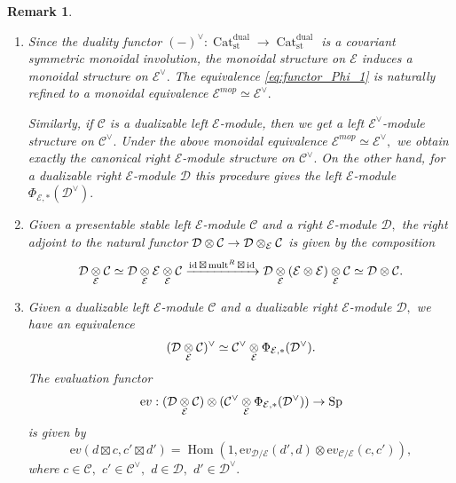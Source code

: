 \documentclass[11pt,leqno]{amsart}
\newtheorem{remark}[theo]{Remark}
\numberwithin{equation}{section}
\def\Hom{\operatorname{Hom}}
\newcommand{\tens}[1]{%
  \mathbin{\mathop{\otimes}\displaylimits_{#1}}%
}
\newcommand{\xto}{\xrightarrow}
\newcommand{\Cat}{\operatorname{Cat}}
\newcommand{\st}{\operatorname{st}}
\newcommand{\dual}{\operatorname{dual}}
\newcommand{\ev}{\mathrm ev}
\newcommand{\cD}{{\mathcal D}}
\newcommand{\cC}{{\mathcal C}}
\newcommand{\cE}{{\mathcal E}}
\newcommand{\Fun}{\operatorname{Fun}}
\newcommand{\Sp}{\operatorname{Sp}}
\newcommand{\id}{\operatorname{id}}
\newcommand{\mult}{\operatorname{mult}}
\begin{document}
\begin{remark}
\begin{enumerate}[label=(\roman*),ref=(\roman*)]
\begin{equation*}
\end{equation*}
Similarly, if $\cD$ is a dualizable right $\cE$-module, then the left $\cE$-module structure on $\cD^{\vee}$ is given by
\begin{equation*}
\cE\xto{\Phi^{-1}_{\cE}}\cE\to\Fun^L(\cD,\cD)^{mop}\simeq \Fun^L(\cD^{\vee},\cD^{\vee}).
\end{equation*}
\item Since the duality functor $(-)^{\vee}:\Cat_{\st}^{\dual}\to\Cat_{\st}^{\dual}$ is a covariant symmetric monoidal involution, the monoidal structure on $\cE$ induces a monoidal structure on $\cE^{\vee}.$ The equivalence \eqref{eq:functor_Phi_1} is naturally refined to a monoidal equivalence $\cE^{mop}\simeq\cE^{\vee}.$

Similarly, if $\cC$ is a dualizable left $\cE$-module, then we get a left $\cE^{\vee}$-module structure on $\cC^{\vee}.$ Under the above monoidal equivalence $\cE^{mop}\simeq\cE^{\vee},$ we obtain exactly the canonical right $\cE$-module structure on $\cC^{\vee}.$ On the other hand, for a dualizable right $\cE$-module $\cD$ this procedure gives the left $\cE$-module $\Phi_{\cE,*}(\cD^{\vee}).$ 
\item Given a presentable stable left $\cE$-module $\cC$ and a right $\cE$-module $\cD,$ the right adjoint to the natural functor $\cD\otimes\cC\to\cD\tens{\cE}\cC$ is given by the composition
\begin{equation*}
\cD\tens{\cE}\cC\simeq \cD\tens{\cE}\cE\tens{\cE}\cC\xto{\id\boxtimes\mult^R\boxtimes\id}\cD\tens{\cE}(\cE\otimes\cE)\tens{\cE}\cC\simeq\cD\otimes\cC.
\end{equation*}
\item Given a dualizable left $\cE$-module $\cC$ and a dualizable right $\cE$-module $\cD,$ we have an equivalence \begin{equation*}
(\cD\tens{\cE}\cC)^{\vee}\simeq\cC^{\vee}\tens{\cE}\Phi_{\cE,*}(\cD^{\vee}).\end{equation*}
The evaluation functor
\begin{equation*}
\ev:(\cD\tens{\cE}\cC)\otimes (\cC^{\vee}\tens{\cE}\Phi_{\cE,*}(\cD^{\vee}))\to\Sp
\end{equation*}
is given by
\begin{equation*}
\ev(d\boxtimes c,c'\boxtimes d')=\Hom(1,\ev_{\cD/\cE}(d',d)\otimes \ev_{\cC/\cE}(c,c')),
\end{equation*}
where $c\in\cC,$ $c'\in\cC^{\vee},$ $d\in\cD,$ $d'\in\cD^{\vee}.$ \label{non_trivial_duality_for_tensor_products}

\end{enumerate}
\end{remark}
\end{document}
